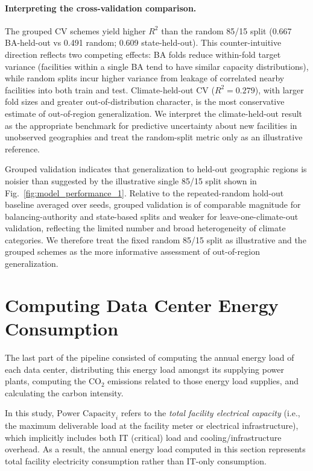 \documentclass[12pt]{article}
\begin{document}
\paragraph{Interpreting the cross-validation comparison.} The grouped CV
schemes yield higher $R^2$ than the random 85/15 split (0.667 BA-held-out vs
0.491 random; 0.609 state-held-out). This counter-intuitive direction
reflects two competing effects: BA folds reduce within-fold target variance
(facilities within a single BA tend to have similar capacity distributions),
while random splits incur higher variance from leakage of correlated nearby
facilities into both train and test. Climate-held-out CV ($R^2 = 0.279$),
with larger fold sizes and greater out-of-distribution character, is the
most conservative estimate of out-of-region generalization. We interpret
the climate-held-out result as the appropriate benchmark for predictive
uncertainty about new facilities in unobserved geographies and treat the
random-split metric only as an illustrative reference.

Grouped validation indicates that generalization to held-out geographic regions is noisier than suggested by the illustrative single 85/15 split shown in Fig.~\ref{fig:model_performance_1}. Relative to the repeated-random hold-out baseline averaged over seeds, grouped validation is of comparable magnitude for balancing-authority and state-based splits and weaker for leave-one-climate-out validation, reflecting the limited number and broad heterogeneity of climate categories. We therefore treat the fixed random 85/15 split as illustrative and the grouped schemes as the more informative assessment of out-of-region generalization.

\section{Computing Data Center Energy Consumption }\label{sm:s3}

The last part of the pipeline consisted of computing the annual energy load of each data center, distributing this energy load amongst its supplying power plants, computing the CO$_2$ emissions related to those energy load supplies, and calculating the carbon intensity. 

In this study, $\text{Power Capacity}_{i}$ refers to the \emph{total facility electrical capacity} 
(i.e., the maximum deliverable load at the facility meter or electrical infrastructure), 
which implicitly includes both IT (critical) load and cooling/infrastructure overhead. 
As a result, the annual energy load computed in this section represents total facility 
electricity consumption rather than IT-only consumption.
\end{document}
